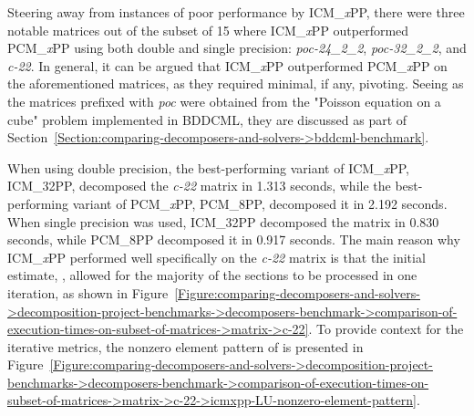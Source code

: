 Steering away from instances of poor performance by ICM\_\textit{x}PP, there were three notable matrices out of the subset of 15 where ICM\_\textit{x}PP outperformed PCM\_\textit{x}PP using both double and single precision: \textit{poc-24\_2\_2}, \textit{poc-32\_2\_2}, and \textit{c-22}.
In general, it can be argued that ICM\_\textit{x}PP outperformed PCM\_\textit{x}PP on the aforementioned matrices, as they required minimal, if any, pivoting.
Seeing as the matrices prefixed with \textit{poc} were obtained from the "Poisson equation on a cube" problem implemented in BDDCML, they are discussed as part of Section~\ref{Section:comparing-decomposers-and-solvers->bddcml-benchmark}.

When using double precision, the best-performing variant of ICM\_\textit{x}PP, ICM\_32PP, decomposed the \textit{c-22} matrix in 1.313 seconds, while the best-performing variant of PCM\_\textit{x}PP, PCM\_8PP, decomposed it in 2.192 seconds.
When single precision was used, ICM\_32PP decomposed the matrix in 0.830 seconds, while PCM\_8PP decomposed it in 0.917 seconds.
The main reason why ICM\_\textit{x}PP performed well specifically on the \textit{c-22} matrix is that the initial estimate, , allowed for the majority of the sections to be processed in one iteration, as shown in Figure~\ref{Figure:comparing-decomposers-and-solvers->decomposition-project-benchmarks->decomposers-benchmark->comparison-of-execution-times-on-subset-of-matrices->matrix->c-22}.
To provide context for the iterative metrics, the nonzero element pattern of  is presented in Figure~\ref{Figure:comparing-decomposers-and-solvers->decomposition-project-benchmarks->decomposers-benchmark->comparison-of-execution-times-on-subset-of-matrices->matrix->c-22->icmxpp-LU-nonzero-element-pattern}.

